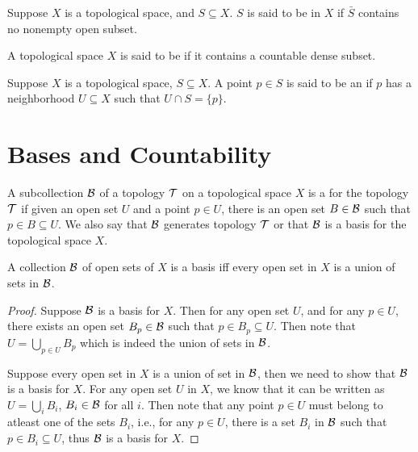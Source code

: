 \documentclass[11pt,a4paper]{article}
\begin{document}
\begin{definition}
Suppose $X$ is a topological space, and $S\subseteq X$. $S$ is said to be  in ${X}$ if $\bar{S}$ contains no nonempty open subset.
\end{definition}

\begin{definition}
A topological space $X$ is said to be  if it contains a countable dense subset.
\end{definition}

\begin{definition}
Suppose $X$ is a topological space, $S\subseteq X$. A point $p\in S$ is said to be an  if $p$ has a neighborhood $U\subseteq X$ such that $U\cap S = \{p\}$.
\end{definition}

\section{Bases and Countability}

\begin{definition}
A subcollection $\mathcal{B}$ of a topology $\mathcal{T}$ on a topological space $X$ is a  for the topology $\mathcal{T}$ if given an open set $U$ and a point $p\in U$, there is an open set $B\in\mathcal{B}$ such that $p\in B\subseteq U$. We also say that {${\mathcal{B}}$ generates topology ${\mathcal{T}}$} or that $\mathcal{B}$ is a {basis for the topological space ${X}$}.
\end{definition}

\begin{proposition}\label{prop:basis_union_characterization}
A collection $\mathcal{B}$ of open sets of $X$ is a basis iff every open set in $X$ is a union of sets in $\mathcal{B}$.
\end{proposition}

\begin{proof}
\forward Suppose $\mathcal{B}$ is a basis for $X$. Then for any open set $U$, and for any $p\in U$, there exists an open set $B_p\in \mathcal{B}$ such that $p\in B_p\subseteq U$. Then note that $U = \bigcup_{p\in U} B_p$ which is indeed the union of sets in $\mathcal{B}$.

\noindent\converse Suppose every open set in $X$ is a union of set in $\mathcal{B}$, then we need to show that $\mathcal{B}$ is a basis for $X$. For any open set $U$ in $X$, we know that it can be written as $U = \bigcup_{i} B_i$, $B_i\in \mathcal{B}$ for all $i$. Then note that any point $p\in U$ must belong to atleast one of the sets $B_i$, i.e., for any $p\in U$, there is a set $B_i$ in $\mathcal{B}$ such that $p\in B_i\subseteq U$, thus $\mathcal{B}$ is a basis for $X$. 
\end{proof}
\end{document}
